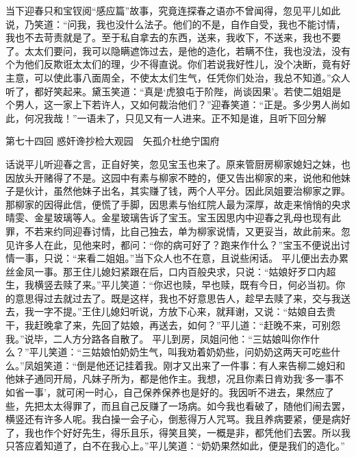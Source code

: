 \documentclass[12pt,oneside]{book}
\begin{document}
当下迎春只和宝钗阅“感应篇”故事，究竟连探春之语亦不曾闻得，忽见平儿如此说，乃笑道：“问我，我也没什么法子。他们的不是，自作自受，我也不能讨情，我也不去苛责就是了。至于私自拿去的东西，送来，我收下，不送来，我也不要了。太太们要问，我可以隐瞒遮饰过去，是他的造化，若瞒不住，我也没法，没有个为他们反欺诳太太们的理，少不得直说。你们若说我好性儿，没个决断，竟有好主意，可以使此事八面周全，不使太太们生气，任凭你们处治，我总不知道。”众人听了，都好笑起来。黛玉笑道：“真是‘虎狼屯于阶陛，尚谈因果’。若使二姐姐是个男人，这一家上下若许人，又如何裁治他们？”迎春笑道：“正是。多少男人尚如此，何况我哉！”一语未了，只见又有一人进来。正不知是谁，且听下回分解


 
第七十四回  惑奸谗抄检大观园　矢孤介杜绝宁国府


话说平儿听迎春之言，正自好笑，忽见宝玉也来了。原来管厨房柳家媳妇之妹，也因放头开赌得了不是。这园中有素与柳家不睦的，便又告出柳家的来，说他和他妹子是伙计，虽然他妹子出名，其实赚了钱，两个人平分。因此凤姐要治柳家之罪。那柳家的因得此信，便慌了手脚，因思素与怡红院人最为深厚，故走来悄悄的央求晴雯、金星玻璃等人。金星玻璃告诉了宝玉。宝玉因思内中迎春之乳母也现有此罪，不若来约同迎春讨情，比自己独去，单为柳家说情，又更妥当，故此前来。忽见许多人在此，见他来时，都问：“你的病可好了？跑来作什么？”宝玉不便说出讨情一事，只说：“来看二姐姐。”当下众人也不在意，且说些闲话。
平儿便出去办累丝金凤一事。那王住儿媳妇紧跟在后，口内百般央求，只说：“姑娘好歹口内超生，我横竖去赎了来。”平儿笑道：“你迟也赎，早也赎，既有今日，何必当初。你的意思得过去就过去了。既是这样，我也不好意思告人，趁早去赎了来，交与我送去，我一字不提。”王住儿媳妇听说，方放下心来，就拜谢，又说：“姑娘自去贵干，我赶晚拿了来，先回了姑娘，再送去，如何？”平儿道：“赶晚不来，可别怨我。”说毕，二人方分路各自散了。
平儿到房，凤姐问他：“三姑娘叫你作什么？”平儿笑道：“三姑娘怕奶奶生气，叫我劝着奶奶些，问奶奶这两天可吃些什么。”凤姐笑道：“倒是他还记挂着我。刚才又出来了一件事：有人来告柳二媳妇和他妹子通同开局，凡妹子所为，都是他作主。我想，况且你素日肯劝我‘多一事不如省一事’，就可闲一时心，自己保养保养也是好的。我因听不进去，果然应了些，先把太太得罪了，而且自己反赚了一场病。如今我也看破了，随他们闹去罢，横竖还有许多人呢。我白操一会子心，倒惹得万人咒骂。我且养病要紧，便是病好了，我也作个好好先生，得乐且乐，得笑且笑，一概是非，都凭他们去罢。所以我只答应着知道了，白不在我心上。”平儿笑道：“奶奶果然如此，便是我们的造化。”
\end{document}
